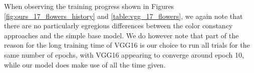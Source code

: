 \def\historygraphheight{5cm}

When observing the training progress shown in Figures \ref{fig:ours_17_flowers_history} and \ref{table:vgg_17_flowers}, we again note that there are no particularly
egregious differences between the color constancy approaches and the simple base model. We do however note that part of the reason for the long training time of VGG16
is our choice to run all trials for the same number of epochs, with VGG16 appearing to converge around epoch 10, while our model does make use of all the time given.

\ourssmalltrainloss
{}\ourssmalltrainacc
{}\ourssmallvalloss
{}\ourssmallvalacc

